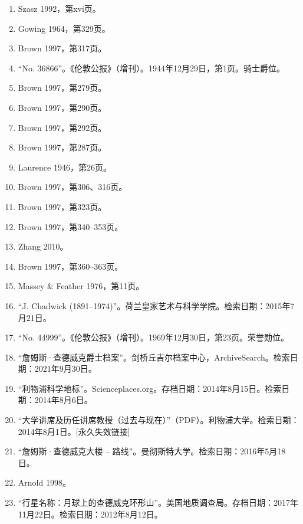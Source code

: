 \begin{enumerate}
\item Szasz 1992，第xvi页。
\item Gowing 1964，第329页。
\item Brown 1997，第317页。
\item “No. 36866”。《伦敦公报》（增刊）。1944年12月29日，第1页。骑士爵位。
\item Brown 1997，第279页。
\item Brown 1997，第290页。
\item Brown 1997，第292页。
\item Brown 1997，第287页。
\item Laurence 1946，第26页。
\item Brown 1997，第306、316页。
\item Brown 1997，第323页。
\item Brown 1997，第340–353页。
\item Zhang 2010。
\item Brown 1997，第360–363页。
\item Massey & Feather 1976，第11页。
\item “J. Chadwick (1891–1974)”。荷兰皇家艺术与科学学院。检索日期：2015年7月21日。
\item “No. 44999”。《伦敦公报》（增刊）。1969年12月30日，第23页。荣誉勋位。
\item “詹姆斯·查德威克爵士档案”。剑桥丘吉尔档案中心，ArchiveSearch。检索日期：2021年9月30日。
\item “利物浦科学地标”。Scienceplaces.org。存档日期：2014年8月15日。检索日期：2014年8月6日。
\item “大学讲席及历任讲席教授（过去与现在）”（PDF）。利物浦大学。检索日期：2014年8月1日。[永久失效链接]
\item “詹姆斯·查德威克大楼 – 路线”。曼彻斯特大学。检索日期：2016年5月18日。
\item Arnold 1998。
\item “行星名称：月球上的查德威克环形山”。美国地质调查局。存档日期：2017年11月22日。检索日期：2012年8月12日。
\end{enumerate}
